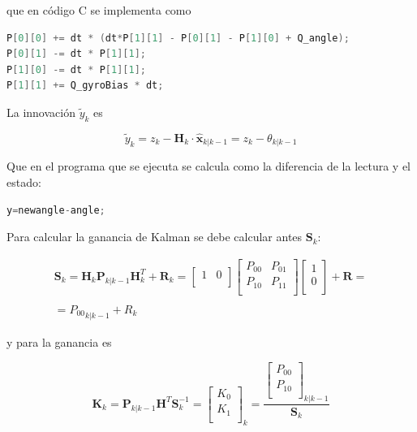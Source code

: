 \documentclass[twoside,11pt]{book}
\begin{document}
que en código C se implementa como

\begin{lstlisting}[language=C,firstnumber=3]
P[0][0] += dt * (dt*P[1][1] - P[0][1] - P[1][0] + Q_angle);
P[0][1] -= dt * P[1][1];
P[1][0] -= dt * P[1][1];
P[1][1] += Q_gyroBias * dt;
\end{lstlisting}

La innovación $\tilde{y}_{k}$ es 

\begin{equation}
\tilde{y}_{k}=z_{k} - \mathbf{H}_{k}\cdot \hat{\mathbf{x}}_{k|k-1}=z_{k} - \theta_{k|k-1}
\end{equation}

Que en el programa que se ejecuta se calcula como la diferencia de la lectura y el estado:

\begin{lstlisting}[language=C,firstnumber=7]
y=newangle-angle;
\end{lstlisting}

Para calcular la ganancia de Kalman se debe calcular antes $\mathbf{S}_{k}$: 

\begin{equation}
\begin{array}{c}
\mathbf{S}_{k}=\mathbf{H}_{k} \mathbf{P}_{k|k-1} \mathbf{H}_{k}^{T} + \mathbf{R}_{k} = \left[ \begin{array}{cc}
1 & 0 \\ \end{array} \right] \left[ \begin{array}{cc}
P_{00} & P_{01} \\
P_{10} & P_{11} \\ \end{array} \right] \left[ \begin{array}{c}
1 \\
0 \\ \end{array} \right] + \mathbf{R}= \\
\\
={P_{00}}_{k|k-1} + R_{k}
\end{array}
\end{equation}

y para la ganancia es

\begin{equation}
\mathbf{K}_{k}=\mathbf{P}_{k|k-1}\mathbf{H}^{T}\mathbf{S}_{k}^{-1}= \left[ \begin{array}{c}
K_{0} \\
K_{1} \\ \end{array} \right] _{k} = \frac{\left[ \begin{array}{c}
P_{00} \\
P_{10} \\ \end{array} \right]_{k|k-1}}{\mathbf{S}_{k}}
\end{equation}
\end{document}
